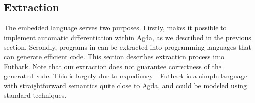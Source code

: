 % 
\subsection{Extraction\label{sec:extraction}}

The embedded language  serves two purposes. Firstly,  makes it
possible to implement automatic differentiation within Agda, as we described in
the previous section. Secondly, programs in  can be extracted into
programming languages that can generate efficient code. This section describes
extraction process into Futhark. Note that our extraction does not guarantee
correctness of the generated code. This is largely due to expediency---Futhark
is a simple language with straightforward semantics quite close to Agda, and
could be modeled using standard techniques.

